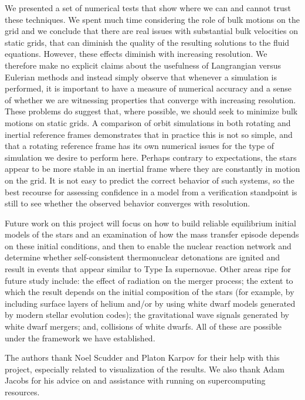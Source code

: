 \documentclass[iop]{emulateapj}
\begin{document}
We presented a set of numerical tests that show where we can 
and cannot trust these techniques. We spent much time considering 
the role of bulk motions on the grid and we conclude that there 
are real issues with substantial bulk velocities on static grids, 
that can diminish the quality of the resulting solutions to the 
fluid equations. However, these effects diminish with increasing 
resolution. We therefore make no explicit claims about the usefulness 
of Langrangian versus Eulerian methods and instead simply observe 
that whenever a simulation is performed, it is important to have 
a measure of numerical accuracy and a sense of whether we are 
witnessing properties that converge with increasing resolution.
These problems do suggest that, where possible, we should seek to 
minimize bulk motions on static grids. A comparison of orbit 
simulations in both rotating and inertial reference frames 
demonstrates that in practice this is not so simple, and that 
a rotating reference frame has its own numerical issues for 
the type of simulation we desire to perform here. Perhaps contrary 
to expectations, the stars appear to be more stable in an inertial 
frame where they are constantly in motion on the grid. It 
is not easy to predict the correct behavior of such systems, 
so the best recourse for assessing confidence in a model from a 
verification standpoint is still to see whether the observed 
behavior converges with resolution.

Future work on this project will focus on how to build 
reliable equilibrium initial models of the stars and 
an examination of how the mass transfer episode depends on 
these initial conditions, and then to enable the nuclear 
reaction network and determine whether self-consistent 
thermonuclear detonations are ignited and result in 
events that appear similar to Type Ia supernovae. Other 
areas ripe for future study include: the effect of radiation 
on the merger process; the extent to which the result 
depends on the initial composition of the stars (for example, 
by including surface layers of helium and/or by using 
white dwarf models generated by modern stellar evolution 
codes); the gravitational wave signals generated by 
white dwarf mergers; and, collisions of white dwarfs. All of 
these are possible under the framework we have established.

\acknowledgments

The authors thank Noel Scudder and Platon Karpov for their help with 
this project, especially related to visualization of the results. 
We also thank Adam Jacobs for his advice on and assistance with 
running on supercomputing resources.
\end{document}
